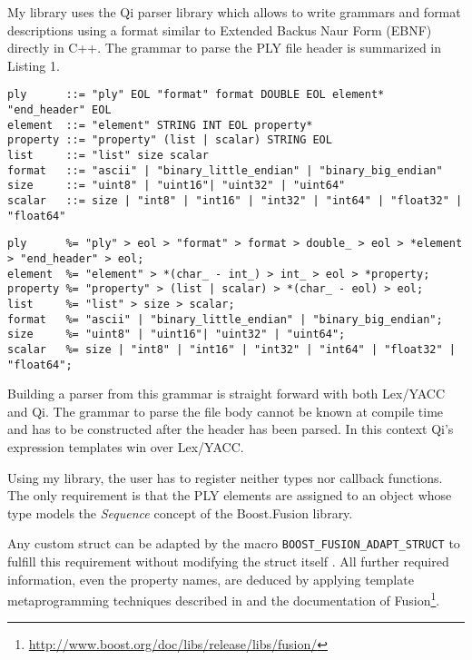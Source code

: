 \documentclass[a4paper,parskip=half,twocolumn]{scrartcl}
\begin{document}
My library uses the Qi parser library which allows to write grammars and format
descriptions using a format similar to Extended Backus Naur Form (EBNF) directly
in C++. The grammar to parse the PLY file header is summarized in Listing 1.

\begin{lstlisting}[float=*,frame=tb,caption=EBNF Grammar of the PLY file header]
ply      ::= "ply" EOL "format" format DOUBLE EOL element* "end_header" EOL
element  ::= "element" STRING INT EOL property*
property ::= "property" (list | scalar) STRING EOL
list     ::= "list" size scalar
format   ::= "ascii" | "binary_little_endian" | "binary_big_endian"
size     ::= "uint8" | "uint16"| "uint32" | "uint64"
scalar   ::= size | "int8" | "int16" | "int32" | "int64" | "float32" | "float64"
\end{lstlisting}

\begin{lstlisting}[float=*,frame=tb,caption=C++ Grammar of the PLY file header]
ply      %= "ply" > eol > "format" > format > double_ > eol > *element > "end_header" > eol;
element  %= "element" > *(char_ - int_) > int_ > eol > *property;
property %= "property" > (list | scalar) > *(char_ - eol) > eol;
list     %= "list" > size > scalar;
format   %= "ascii" | "binary_little_endian" | "binary_big_endian";
size     %= "uint8" | "uint16"| "uint32" | "uint64";
scalar   %= size | "int8" | "int16" | "int32" | "int64" | "float32" | "float64";
\end{lstlisting}


Building a parser from this grammar is straight forward with both Lex/YACC and
Qi. The grammar to parse the file body cannot be known at compile time and has
to be constructed after the header has been parsed. In this context Qi's
expression templates win over Lex/YACC.

Using my library, the user has to register neither types nor callback functions.
The only requirement is that the PLY elements are assigned to an object whose
type models the \emph{Sequence} concept of the Boost.Fusion library.

Any custom struct can be adapted by the macro
\texttt{BOOST\_FUSION\_ADAPT\_STRUCT} to fulfill this requirement without
modifying the struct itself . All further required information, even the
property names, are deduced by applying template metaprogramming techniques
described in \cite{Abrahams:2004:CTM:1044941} and the documentation of
Fusion\footnote{\url{http://www.boost.org/doc/libs/release/libs/fusion/}}.
\end{document}
